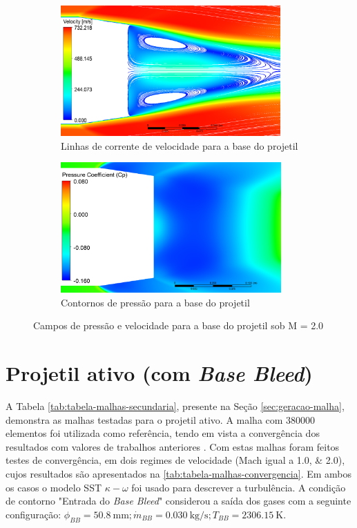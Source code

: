 \begin{figure}[!ht]
    \centering
    \begin{subfigure}[b]{0.47\textwidth}
        \centering
        \includegraphics[height=5cm,width=\textwidth]{corrente-velocidade-off.png}
        \caption{Linhas de corrente de velocidade para a base do projetil}
        \label{fig:corrente-velocidade-base-sembasebleed}    
    \end{subfigure}
    \hfill
    \begin{subfigure}[b]{0.47\textwidth}
        \centering    
        \includegraphics[height=5cm,width=\textwidth]{coeficientepressao-INERTE.png}
        \caption{Contornos de pressão para a base do projetil}
        \label{fig:contorno-pressao-base-sembasebleed}
    \end{subfigure}
    \caption{Campos de pressão e velocidade para a base do projetil sob M = \num{2,0}}
    \label{fig:campos-pressao-velocidade-base-sembasebleed}
\end{figure}

\section{Projetil ativo (com \textit{Base Bleed})}\label{sec:resultados-com-basebleed}

A Tabela \ref{tab:tabela-malhas-secundaria}, presente na Seção \ref{sec:geracao-malha}, demonstra as malhas testadas para o projetil ativo. A malha com \num{380000} elementos foi utilizada como referência, tendo em vista a convergência dos resultados com valores de trabalhos anteriores \cite{Mahmoud2009}. Com estas malhas foram feitos testes de convergência, em dois regimes de velocidade (Mach igual a \numlist{1,0;2,0}), cujos resultados são apresentados na \autoref{tab:tabela-malhas-convergencia}. Em ambos os casos o modelo SST \(\kappa-\omega\) foi usado para descrever a turbulência. A condição de contorno "Entrada do \textit{Base Bleed}"{} considerou a saída dos gases com a seguinte configuração: \(\phi_{BB} = \qty{50,8}{\milli\metre}; \Dot{m}_{BB} = \qty{0,030}{\kilogram\per\second}; T_{BB} = \qty{2306,15}{\kelvin}\).

